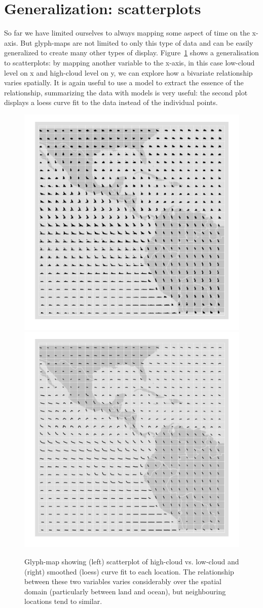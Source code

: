 \documentclass[oneside]{article}
\begin{document}
\section{Generalization: scatterplots}

So far we have limited ourselves to always mapping some aspect of time on the x-axis. But glyph-maps are not limited to only this type of data and can  be easily generalized to create many other types of display. Figure~\ref{fig:cloud} shows a generalisation to scatterplots: by mapping another variable to the x-axis, in this case low-cloud level on x and high-cloud level on y, we can explore how a bivariate relationship varies spatially. It is again useful to use a model to extract the essence of the relationship, summarizing the data with models is very useful: the second plot displays a loess curve fit to the data instead of the individual points.  

\begin{figure}[htbp]
  \centering
  \includegraphics[width=0.5\linewidth]{clouds}%
  \includegraphics[width=0.5\linewidth]{clouds-smooth}

  \caption{Glyph-map showing (left) scatterplot of high-cloud vs. low-cloud and (right) smoothed (loess) curve fit to each location. The relationship between these two variables varies considerably over the spatial domain (particularly between land and ocean), but neighbouring locations tend to similar. }
  \label{fig:cloud}
\end{figure}
\end{document}
